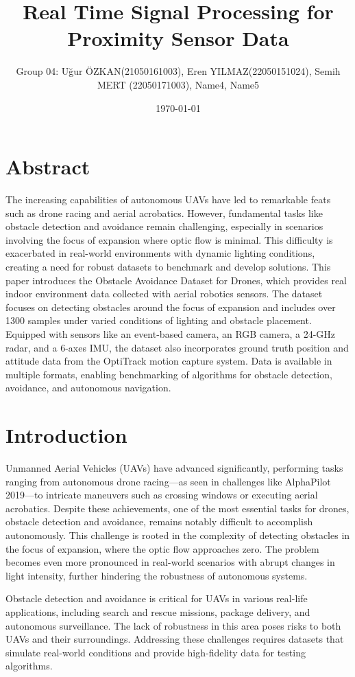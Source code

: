 \documentclass[12pt,a4paper]{article}
\title{Real Time Signal Processing for Proximity Sensor Data}
\author{Group 04: Uğur ÖZKAN(21050161003), Eren YILMAZ(22050151024), Semih MERT (22050171003), Name4, Name5}
\date{\today}
\begin{document}
\maketitle
\section{Abstract}

The increasing capabilities of autonomous UAVs have led to remarkable feats such as drone racing and aerial acrobatics. However, fundamental tasks like obstacle detection and avoidance remain challenging, especially in scenarios involving the focus of expansion where optic flow is minimal. This difficulty is exacerbated in real-world environments with dynamic lighting conditions, creating a need for robust datasets to benchmark and develop solutions. This paper introduces the Obstacle Avoidance Dataset for Drones, which provides real indoor environment data collected with aerial robotics sensors. The dataset focuses on detecting obstacles around the focus of expansion and includes over 1300 samples under varied conditions of lighting and obstacle placement. Equipped with sensors like an event-based camera, an RGB camera, a 24-GHz radar, and a 6-axes IMU, the dataset also incorporates ground truth position and attitude data from the OptiTrack motion capture system. Data is available in multiple formats, enabling benchmarking of algorithms for obstacle detection, avoidance, and autonomous navigation.

\section{Introduction}

Unmanned Aerial Vehicles (UAVs) have advanced significantly, performing tasks ranging from autonomous drone racing—as seen in challenges like AlphaPilot 2019—to intricate maneuvers such as crossing windows or executing aerial acrobatics. Despite these achievements, one of the most essential tasks for drones, obstacle detection and avoidance, remains notably difficult to accomplish autonomously. This challenge is rooted in the complexity of detecting obstacles in the focus of expansion, where the optic flow approaches zero. The problem becomes even more pronounced in real-world scenarios with abrupt changes in light intensity, further hindering the robustness of autonomous systems.

Obstacle detection and avoidance is critical for UAVs in various real-life applications, including search and rescue missions, package delivery, and autonomous surveillance. The lack of robustness in this area poses risks to both UAVs and their surroundings. Addressing these challenges requires datasets that simulate real-world conditions and provide high-fidelity data for testing algorithms.
\end{document}
